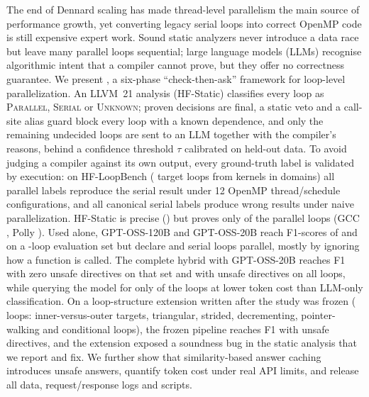 The end of Dennard scaling has made thread-level parallelism the main source of performance growth, yet converting legacy serial loops into correct OpenMP code is still expensive expert work. Sound static analyzers never introduce a data race but leave many parallel loops sequential; large language models (LLMs) recognise algorithmic intent that a compiler cannot prove, but they offer no correctness guarantee. We present \SystemName{}, a six-phase ``check-then-ask'' framework for loop-level parallelization. An LLVM~21 analysis (HF-Static) classifies every loop as \textsc{Parallel}, \textsc{Serial} or \textsc{Unknown}; proven decisions are final, a static veto and a call-site alias guard block every loop with a known dependence, and only the remaining undecided loops are sent to an LLM together with the compiler's reasons, behind a confidence threshold $\tau$ calibrated on held-out data. To avoid judging a compiler against its own output, every ground-truth label is validated by execution: on HF-LoopBench (\nBenchLoops{} target loops from \nBenchBases{} kernels in \nBenchDomains{} domains) all \nOracleVerified{} parallel labels reproduce the serial result under 12 OpenMP thread/schedule configurations, and all \nOracleManifested{} canonical serial labels produce wrong results under naive parallelization. HF-Static is precise (\fsStaticPrec{}) but proves only \fsStaticRec{} of the parallel loops (GCC \fsGccRec{}, Polly \fsPollyRec{}). Used alone, GPT-OSS-120B and GPT-OSS-20B reach F1-scores of \evAIOneTwentyFone{} and \evAITwentyFone{} on a \nEvalLoops{}-loop evaluation set but declare \evAIOneTwentyFP{} and \evAITwentyFP{} serial loops parallel, mostly by ignoring how a function is called. The complete hybrid with GPT-OSS-20B reaches F1 \evHCTwentyFone{} with zero unsafe directives on that set and \fhTwentyFone{} with \fhTwentyFP{} unsafe directives on all \nBenchLoops{} loops, while querying the model for only \projFracTwenty{} of the loops at \projSaveTwenty{} lower token cost than LLM-only classification. On a loop-structure extension written after the study was frozen (\xLoops{} loops: inner-versus-outer targets, triangular, strided, decrementing, pointer-walking and conditional loops), the frozen pipeline reaches F1 \xHTwentyFone{} with \xHTwentyFP{} unsafe directives, and the extension exposed a soundness bug in the static analysis that we report and fix. We further show that similarity-based answer caching introduces unsafe answers, quantify token cost under real API limits, and release all data, request/response logs and scripts.
